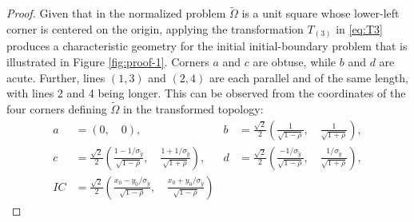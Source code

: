 \begin{proof}
  Given that in the normalized problem $\tilde{\Omega}$ is a unit
  square whose lower-left corner is centered on the origin, applying
  the transformation $T_{(3)}$ in \eqref{eq:T3} produces a
  characteristic geometry for the initial initial-boundary problem
  that is illustrated in Figure \ref{fig:proof-1}. Corners $a$ and $c$
  are obtuse, while $b$ and $d$ are acute. Further, lines $(1,3)$ and
  $(2, 4)$ are each parallel and of the same length, with lines 2 and
  4 being longer. This can be observed from the coordinates of the
  four corners defining $\tilde{\Omega}$ in the transformed topology:
  \begin{align*}
    a &= (0,\quad 0),&
                       b &= \frac{\sqrt{2}}{2} \left( \frac{1}{\sqrt{1-\rho}},\quad \frac{1}{\sqrt{1+\rho}} \right), \\
    c &= \frac{\sqrt{2}}{2} \left( \frac{1-1/\sigma_{\tilde{y}}}{\sqrt{1-\rho}},\quad \frac{1+1/\sigma_{\tilde{y}}}{\sqrt{1+\rho}} \right),&
                                                                                                                                     d &= \frac{\sqrt{2}}{2} \left( \frac{-1/\sigma_{\tilde{y}}}{\sqrt{1-\rho}},\quad \frac{1/\sigma_{\tilde{y}}}{\sqrt{1+\rho}} \right), \\
    IC &= \frac{\sqrt{2}}{2} \left( \frac{x_0 - y_0/\sigma_{\tilde{y}}}{\sqrt{1-\rho}},\quad \frac{x_0 + y_0/\sigma_{\tilde{y}}}{\sqrt{1-\rho}} \right)
  \end{align*}


\end{proof}
